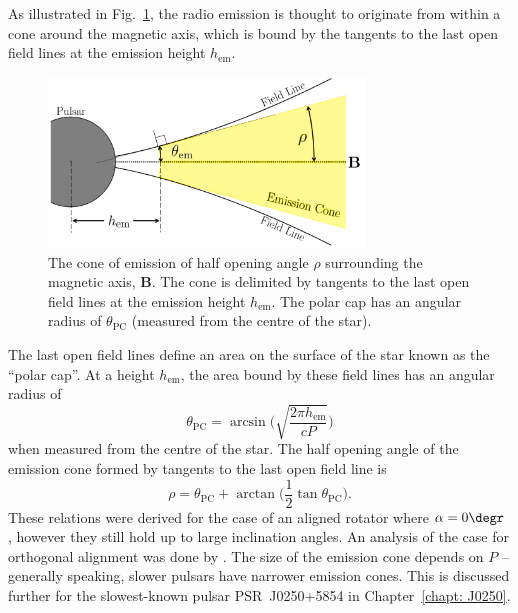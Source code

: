 As illustrated in Fig.~\ref{fig: intro - emission cone}, the radio emission is thought to originate from within a cone around the magnetic axis, which is bound by the tangents to the last open field lines at the emission height $h_\mathrm{em}$.  
\begin{figure}
    \begin{center}
        \includegraphics[width=0.75\textwidth]{Figures/Introduction/cone}
        \caption[The geometry of the emission cone]{The cone of emission of half opening angle $\rho$ surrounding the magnetic axis, $\mathbf{B}$. The cone is delimited by tangents to the last open field lines at the emission height $h_\mathrm{em}$. The polar cap has an angular radius of $\theta_\mathrm{PC}$ (measured from the centre of the star).}
        \label{fig: intro - emission cone}
    \end{center}
\end{figure}
The last open field lines define an area on the surface of the star known as the ``polar cap''. At a height $h_\mathrm{em}$, the area bound by these field lines has an angular radius of 
\begin{equation}
    \label{eq: intro - polar cap radius}
	\theta_\mathrm{PC} = \arcsin\bigg(\sqrt{\frac{2\pi h_\mathrm{em}}{cP}}\bigg)
\end{equation} 
when measured from the centre of the star. The half opening angle of the emission cone formed by tangents to the last open field line is
\begin{equation}
    \label{eq: intro - cone half opening angle}
	\rho = \theta_\mathrm{PC} + \arctan\bigg(\frac{1}{2}\tan\theta_\mathrm{PC}\bigg).
\end{equation} 
These relations were derived for the case of an aligned rotator where $\alpha = 0\degr$ \citep[see][]{PulsarAstronomy}, however they still hold up to large inclination angles. An analysis of the case for orthogonal alignment was done by \citet{MPSx1999}. The size of the emission cone depends on $P$ -- generally speaking, slower pulsars have narrower emission cones. This is discussed further for the slowest-known pulsar PSR~J0250+5854 in Chapter~\ref{chapt: J0250}.








